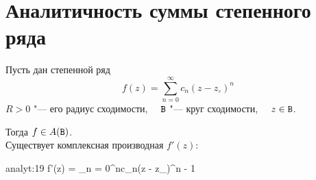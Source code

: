 \section{Аналитичность суммы степенного ряда}

\begin{theorem}
	Пусть дан степенной ряд
	$$ f(z) = \sum_{n = 0}^\infty c_n(z - z_\circ)^n $$
	$ R > 0 $ "--- его радиус сходимости, $ \quad \mathtt{B} $ "--- круг сходимости, $ \quad z \in \mathtt{B} $.

	Тогда $ f \in A(\mathtt{B}) $. \\
	Существует комплексная производная $ f'(z) $:
	\begin{equ}{analyt:19}
		f'(z) = \sum_{n = 0}^\infty nc_n(z - z_\circ)^{n - 1}
	\end{equ}
\end{theorem}

